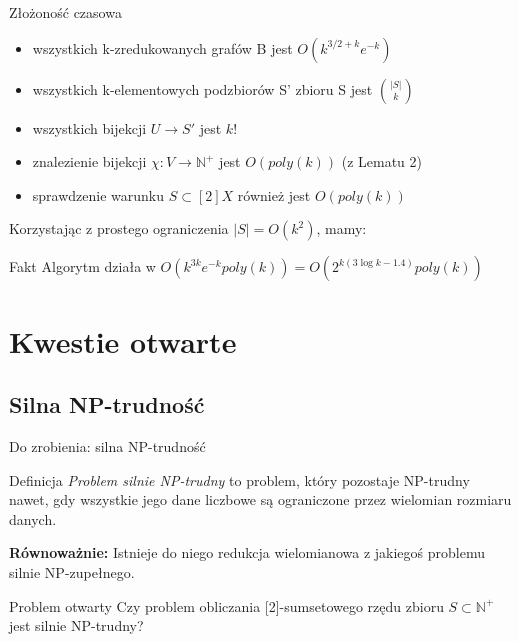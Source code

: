 \documentclass{beamer}
\newcommand{\N}{\mathbb{N}}
\begin{document}
		\begin{frame}{Złożoność czasowa}
			\begin{itemize}
				\item wszystkich k-zredukowanych grafów B jest $ O\left( k^{3/2 + k}e^{-k} \right) $
				\pause \item wszystkich k-elementowych podzbiorów S' zbioru S jest $  \binom{|S|}{k} $
				\pause \item wszystkich bijekcji $ U \rightarrow S' $ jest $ k! $
				\pause \item znalezienie bijekcji $ \chi: V \rightarrow \N^{+} $ jest $ O\left( poly(k) \right) $ (z Lematu 2)
				\pause \item sprawdzenie warunku $ S \subset [2]X $ również jest $ O\left( poly(k) \right) $
			\end{itemize}
			
			\pause
			Korzystając z prostego ograniczenia $ |S| = O\left( k^2 \right)$, mamy:
			
			\begin{exampleblock}{Fakt}			
				Algorytm działa w $ O\left( k^{3k}e^{-k}poly(k) \right) = O\left( 2^{k(3\log k-1.4)}poly(k) \right)$
			\end{exampleblock}		
		\end{frame}
\section{Kwestie otwarte}
	\subsection{Silna NP-trudność}
		\begin{frame}{Do zrobienia: silna NP-trudność}
			\begin{block}{Definicja}
				\emph{Problem silnie NP-trudny} to problem, który pozostaje NP-trudny nawet, gdy wszystkie jego dane liczbowe są ograniczone przez wielomian rozmiaru danych.
				
				\pause \textbf{Równoważnie:} Istnieje do niego redukcja wielomianowa z jakiegoś problemu silnie NP-zupełnego.
			\end{block}				
			
			\pause
			\begin{alertblock}{Problem otwarty}
				Czy problem obliczania [2]-sumsetowego rzędu zbioru $ S \subset \N^{+} $ jest silnie NP-trudny?
			\end{alertblock}
		\end{frame}
		
\end{document}
